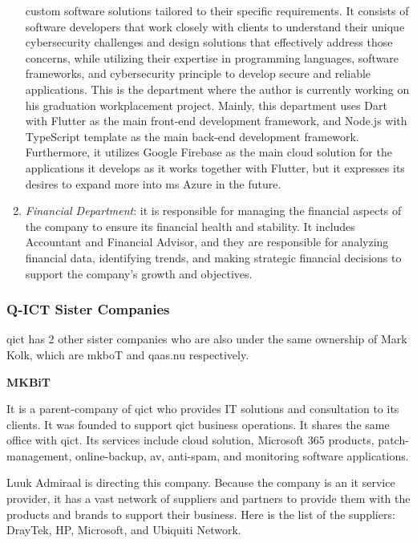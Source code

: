 \begin{multicols}{2}
\begin{enumerate}
                  custom software solutions tailored to their specific requirements. It consists of software
                  developers that work closely with clients to understand their unique cybersecurity challenges and
                  design solutions that effectively address those concerns, while utilizing their expertise in
                  programming languages, software frameworks, and cybersecurity principle to develop secure and
                  reliable applications. This is the department where the author is currently working on his
                  graduation workplacement project. Mainly, this department uses Dart with Flutter as the main
                  front-end development framework, and Node.js with TypeScript template as the main back-end
                  development framework. Furthermore, it utilizes Google Firebase as the  main cloud solution for
                  the applications it develops as it works together with Flutter, but it expresses its
                  desires to expand more into \acrshort{ms} Azure in the future.
            \item \textit{Financial Department}: it is responsible for managing the financial aspects of the company
                  to ensure its financial health and stability. It includes Accountant and Financial Advisor, and
                  they are responsible for analyzing financial data, identifying trends, and making strategic
                  financial decisions to support the company's growth and objectives.
      \end{enumerate}

      \subsubsection{Q-ICT Sister Companies}

      \acrshort{qict} has 2 other sister companies who are also under the same ownership of Mark Kolk, which are \acrshort{mkb}oT and
      \acrshort{qaas}.nu respectively.

      \textbf{MKBiT}

      It is a parent-company of \acrshort{qict} who provides IT solutions and consultation to its clients. It was founded to support
      \acrshort{qict} business operations. It shares the same office with \acrshort{qict}. Its services include cloud solution, Microsoft 365
      products, patch-management, online-backup, \acrshort{av}, anti-spam, and monitoring software applications.

      Luuk Admiraal is directing this company. Because the company is an \acrshort{it} service provider, it has a vast network of suppliers and
      partners to provide them with the products and brands to support their business. Here is the list of the suppliers:
      DrayTek, HP, Microsoft, and Ubiquiti Network.


\end{multicols}
